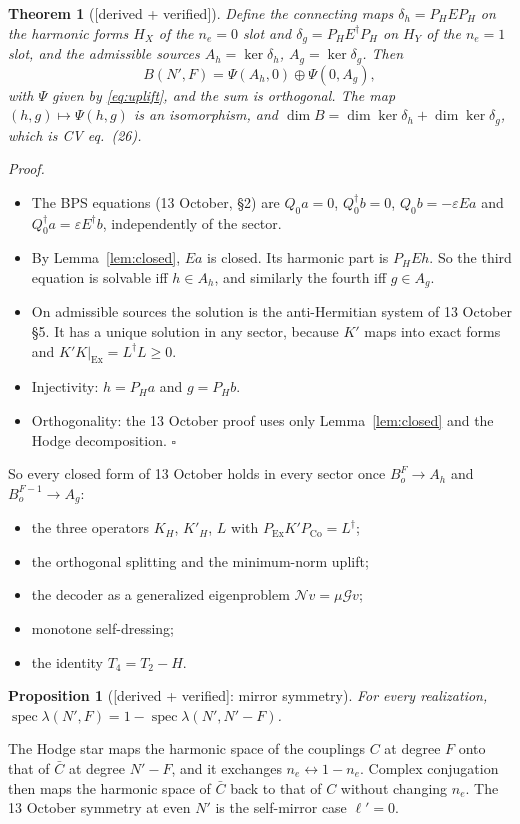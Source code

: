 \documentclass[11pt]{article}
\newcommand{\Np}{N'}
\newcommand{\lp}{\ell'}
\newcommand{\PH}{P_{\!H}}
\newcommand{\Ex}{\mathrm{Ex}}
\newcommand{\Co}{\mathrm{Co}}
\newcommand{\tagbox}[2]{\textsf{\small\color{#1}[#2]}}
\newcommand{\VER}{\tagbox{cder}{derived + verified}}
\theoremstyle{plain}
\newtheorem{theorem}{Theorem}
\newtheorem{proposition}{Proposition}
\theoremstyle{remark}
\numberwithin{equation}{section}
\begin{document}
\begin{theorem}[\VER]\label{thm:general}
Define the connecting maps $\delta_h=\PH E\PH$ on the harmonic forms $H_X$ of the $n_e=0$ slot and
$\delta_g=\PH E^\dagger\PH$ on $H_Y$ of the $n_e=1$ slot, and the admissible sources $A_h=\ker\delta_h$,
$A_g=\ker\delta_g$. Then
\begin{equation}
B(\Np,F)=\Psi(A_h,0)\oplus\Psi(0,A_g),
\end{equation}
with $\Psi$ given by \eqref{eq:uplift}, and the sum is orthogonal. The map $(h,g)\mapsto\Psi(h,g)$ is an isomorphism, and
$\dim B=\dim\ker\delta_h+\dim\ker\delta_g$, which is CV eq.~(26).
\end{theorem}

\noindent\emph{Proof.}
\begin{itemize}\itemsep1pt
\item The BPS equations (13 October, \S2) are $Q_0a=0$, $Q_0^\dagger b=0$, $Q_0b=-\varepsilon Ea$ and
$Q_0^\dagger a=\varepsilon E^\dagger b$, independently of the sector.
\item By Lemma~\ref{lem:closed}, $Ea$ is closed. Its harmonic part is $\PH Eh$. So the third equation is solvable iff
$h\in A_h$, and similarly the fourth iff $g\in A_g$.
\item On admissible sources the solution is the anti-Hermitian system of 13 October \S5. It has a unique solution in any
sector, because $K'$ maps into exact forms and $K'K|_{\Ex}=L^\dagger L\ge0$.
\item Injectivity: $h=\PH a$ and $g=\PH b$.
\item Orthogonality: the 13 October proof uses only Lemma~\ref{lem:closed} and the Hodge decomposition. $\square$
\end{itemize}

\noindent So every closed form of 13 October holds in every sector once $B_o^F\to A_h$ and $B_o^{F-1}\to A_g$:
\begin{itemize}\itemsep1pt
\item the three operators $K_H$, $K'_H$, $L$ with $P_\Ex K'P_\Co=L^\dagger$;
\item the orthogonal splitting and the minimum-norm uplift;
\item the decoder as a generalized eigenproblem $\mathcal N v=\mu\mathcal G v$;
\item monotone self-dressing;
\item the identity $T_4=T_2-H$.
\end{itemize}

\begin{proposition}[\VER: mirror symmetry]\label{prop:mirror}
For every realization, $\operatorname{spec}\lambda(\Np,F)=1-\operatorname{spec}\lambda(\Np,\Np-F)$.
\end{proposition}
\noindent The Hodge star maps the harmonic space of the couplings $C$ at degree $F$ onto that of $\bar C$ at degree
$\Np-F$, and it exchanges $n_e\leftrightarrow1-n_e$. Complex conjugation then maps the harmonic space of $\bar C$ back to
that of $C$ without changing $n_e$. The 13 October symmetry at even $\Np$ is the self-mirror case $\lp=0$.
\end{document}
